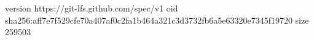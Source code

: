 version https://git-lfs.github.com/spec/v1
oid sha256:aff7e7f529cfe70a407af0c2fa1b464a321c3d3732fb6a5e63320e7345f19720
size 259503
